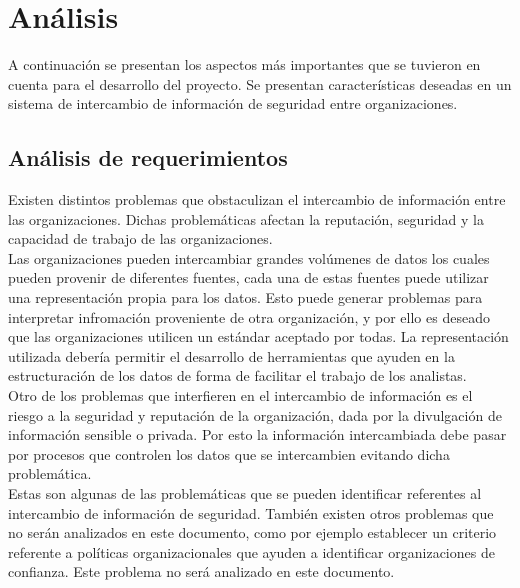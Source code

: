 \setlength\tabcolsep{1mm}
\renewcommand\arraystretch{1.3}
\renewcommand\theFigura{\arabic{Figura}}
\renewcommand\theTabla{\arabic{Tabla}}

\chapter{Análisis}
\label{capitulo3}
	
	A continuación se presentan los aspectos más importantes que se tuvieron en cuenta para el desarrollo del proyecto. Se
	presentan características deseadas en un sistema de intercambio de información de seguridad entre organizaciones.

\section{Análisis de requerimientos}
	Existen distintos problemas que obstaculizan el intercambio de información entre las organizaciones. Dichas
	problemáticas afectan la reputación, seguridad y la capacidad de trabajo de las organizaciones. \\

	Las organizaciones pueden intercambiar grandes volúmenes de datos los cuales pueden provenir de diferentes fuentes, cada
	una de estas fuentes puede utilizar una representación propia para los datos. Esto puede generar problemas para interpretar infromación proveniente de otra organización, y por ello es deseado que las
	organizaciones utilicen un estándar aceptado por todas. La representación utilizada debería permitir el desarrollo de
	herramientas que ayuden en la estructuración de los datos de forma de facilitar el trabajo de los
	analistas.\\

	Otro de los problemas que interfieren en el intercambio de información es el riesgo a la seguridad y reputación de la
	organización, dada por la divulgación de información sensible o privada. Por esto la información intercambiada debe pasar por procesos que controlen los datos que se intercambien evitando dicha problemática.\\

	Estas son algunas de las problemáticas que se pueden identificar referentes al intercambio de información de seguridad.
	También existen otros problemas que no serán analizados en este documento, como por ejemplo establecer un criterio referente a políticas organizacionales que
	ayuden a identificar organizaciones de confianza. Este problema no será analizado en este documento.\\


